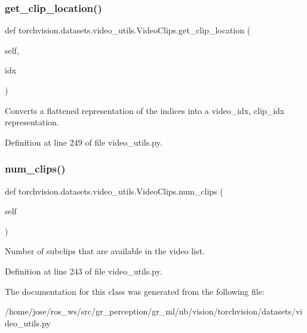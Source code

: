 \subsubsection{\texorpdfstring{get\+\_\+clip\+\_\+location()}{get\_clip\_location()}}
{\footnotesize\ttfamily def torchvision.\+datasets.\+video\+\_\+utils.\+Video\+Clips.\+get\+\_\+clip\+\_\+location (\begin{DoxyParamCaption}\item[{}]{self,  }\item[{}]{idx }\end{DoxyParamCaption})}

\begin{DoxyVerb}Converts a flattened representation of the indices into a video_idx, clip_idx
representation.
\end{DoxyVerb}
 

Definition at line 249 of file video\+\_\+utils.\+py.

\mbox{\label{classtorchvision_1_1datasets_1_1video__utils_1_1VideoClips_a278d29cc385ec49a301cb3c59026503b}} 
\subsubsection{\texorpdfstring{num\+\_\+clips()}{num\_clips()}}
{\footnotesize\ttfamily def torchvision.\+datasets.\+video\+\_\+utils.\+Video\+Clips.\+num\+\_\+clips (\begin{DoxyParamCaption}\item[{}]{self }\end{DoxyParamCaption})}

\begin{DoxyVerb}Number of subclips that are available in the video list.
\end{DoxyVerb}
 

Definition at line 243 of file video\+\_\+utils.\+py.



The documentation for this class was generated from the following file\+:\begin{DoxyCompactItemize}
\item 
/home/jose/ros\+\_\+ws/src/gr\+\_\+perception/gr\+\_\+ml/nb/vision/torchvision/datasets/video\+\_\+utils.\+py\end{DoxyCompactItemize}
